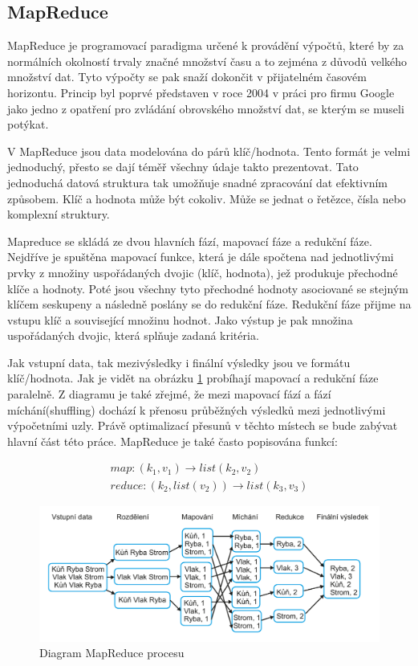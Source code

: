 \documentclass[thesis=M,czech]{FITthesis}[2012/06/26]
\begin{document}
\subsection{MapReduce}
MapReduce je programovací paradigma určené k provádění výpočtů, které by za normálních okolností trvaly značné množství času a to zejména z důvodů velkého množství dat. Tyto výpočty se pak snaží dokončit v přijatelném časovém horizontu. Princip byl poprvé představen v roce 2004 v  práci pro firmu Google jako jedno z opatření pro zvládání obrovského množství dat, se kterým se museli potýkat.

V MapReduce jsou data modelována do párů klíč/hodnota. Tento formát je velmi jednoduchý, přesto se dají téměř všechny údaje takto prezentovat. Tato jednoduchá datová struktura tak umožňuje snadné zpracování dat efektivním způsobem. Klíč a hodnota může být cokoliv. Může se jednat o řetězce, čísla nebo komplexní struktury.

Mapreduce se skládá ze dvou hlavních fází, mapovací fáze a redukční fáze. Nejdříve je spuštěna mapovací funkce, která je dále spočtena nad jednotlivými prvky z množiny uspořádaných dvojic (klíč, hodnota), jež produkuje přechodné klíče a hodnoty.\cite{HadoopDG}
Poté jsou všechny tyto přechodné hodnoty asociované se stejným klíčem seskupeny a následně poslány se do redukční fáze. Redukční fáze přijme na vstupu klíč a související množinu hodnot. Jako výstup je pak množina uspořádaných dvojic, která splňuje zadaná kritéria.

Jak vstupní data, tak mezivýsledky i finální výsledky jsou ve formátu klíč/hodnota. Jak je vidět na obrázku \ref{fig:mapred} probíhají mapovací a redukční fáze paralelně. Z diagramu je také zřejmé, že mezi mapovací fází a fází míchání(shuffling) dochází k přenosu průběžných výsledků mezi jednotlivými výpočetními uzly. Právě optimalizací přesunů v těchto místech se bude zabývat hlavní část této práce. 
MapReduce je také často popisována funkcí: 

\begin{eqnarray}
	map: (k_1, v_1) \rightarrow  list(k_2, v_2) \nonumber \\
	reduce: (k_2, list(v_2)) \rightarrow list(k_3, v_3) \nonumber 
\end{eqnarray}

\begin{figure}\centering
	\includegraphics[width=1\textwidth, angle=0]			{files/MapReduce}
	\caption[Diagram MapReduce procesu]{Diagram MapReduce procesu}\label{fig:mapred}
\end{figure} 
\end{document}
